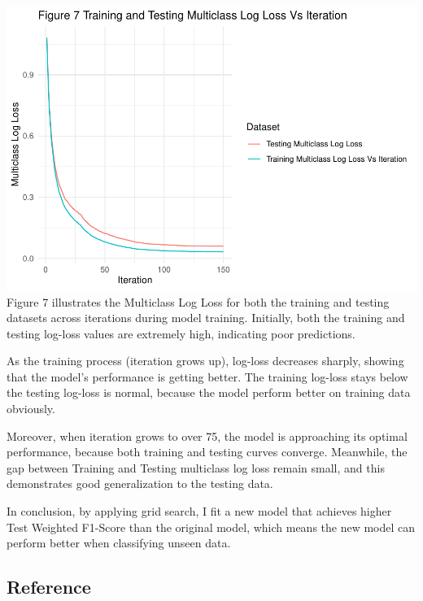 \documentclass[
]{article}
\begin{document}
\includegraphics{Code_C_files/figure-latex/plot of multicalss log loss graph-1.pdf}
Figure 7 illustrates the Multiclass Log Loss for both the training and
testing datasets across iterations during model training. Initially,
both the training and testing log-loss values are extremely high,
indicating poor predictions.

As the training process (iteration grows up), log-loss decreases
sharply, showing that the model's performance is getting better. The
training log-loss stays below the testing log-loss is normal, because
the model perform better on training data obviously.

Moreover, when iteration grows to over 75, the model is approaching its
optimal performance, because both training and testing curves converge.
Meanwhile, the gap between Training and Testing multiclass log loss
remain small, and this demonstrates good generalization to the testing
data.

In conclusion, by applying grid search, I fit a new model that achieves
higher Test Weighted F1-Score than the original model, which means the
new model can perform better when classifying unseen data.

\subsection*{Reference}\label{reference}
\end{document}
